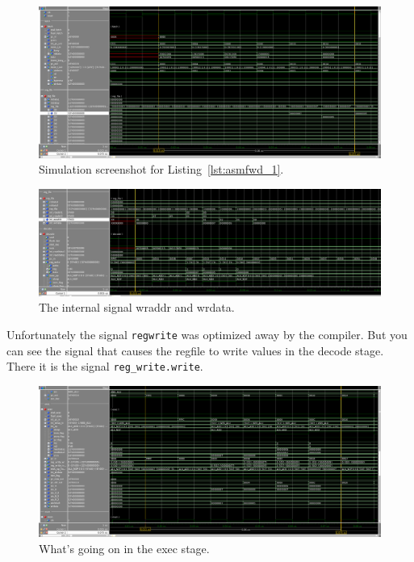 \begin{figure}[ht!]
\centering
\includegraphics[width=1.0\linewidth]{task_1_fetch_regfile.png}
\caption{Simulation screenshot for Listing~\ref{lst:asmfwd_1}.}
\label{fig:sim1}
\end{figure}

\begin{figure}[ht!]
\centering
\includegraphics[width=1.0\linewidth]{task_1_regwrite.png}
\caption{The internal signal wraddr and wrdata.}
\label{fig:sim2}
\end{figure}
Unfortunately the signal \texttt{regwrite} was optimized away by the compiler. But you can see the
signal that causes the regfile to write values in the decode stage. There it is the signal \texttt{reg\_write.write}.

\begin{figure}[ht!]
\centering
\includegraphics[width=1.0\linewidth]{task_1_exec.png}
\caption{What's going on in the exec stage.}
\label{fig:sim3}
\end{figure}

